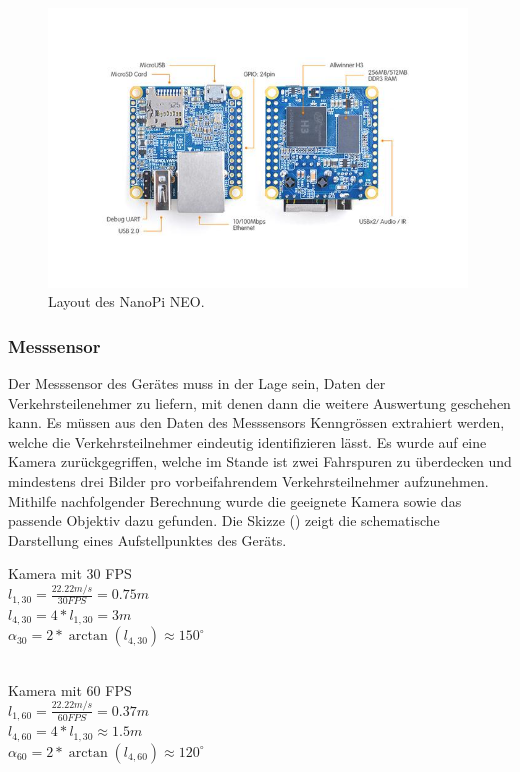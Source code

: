 \begin{figure}[H]
  \centering
  \includegraphics[width=0.99\textwidth]{Hardware/NanoPi_Neo.jpg} 
  \caption{Layout des NanoPi NEO. \cite{NanoPiNeo}}
  \label{bLayout}
\end{figure}

\subsubsection{Messsensor}
Der Messsensor des Gerätes muss in der Lage sein, Daten der Verkehrsteilenehmer zu liefern, mit denen dann die weitere Auswertung geschehen kann. Es müssen aus den Daten des Messsensors Kenngrössen extrahiert werden, welche die Verkehrsteilnehmer eindeutig identifizieren lässt. Es wurde auf eine Kamera zurückgegriffen, welche im Stande ist zwei Fahrspuren zu überdecken und mindestens drei Bilder pro vorbeifahrendem Verkehrsteilnehmer aufzunehmen. \\
Mithilfe nachfolgender Berechnung wurde die geeignete Kamera sowie das passende Objektiv dazu gefunden. Die Skizze () zeigt die schematische Darstellung eines Aufstellpunktes des Geräts.
\begin{citemize}

\item Kamera mit 30 FPS \\
$l_{ 1,30 } = \frac{ 22.22 m/s }{ 30 FPS} = 0.75 m$ \\ 
$l_{ 4,30 } = 4 * l_{1,30} = 3 m$\\
$\alpha_{30} = 2* \arctan(l_{4,30 }) \approx 150^\circ$ \\\\


\item Kamera mit 60 FPS \\
$l_{ 1,60 } = \frac{ 22.22 m/s }{ 60 FPS} = 0.37 m$ \\ 
$l_{ 4,60 } = 4 * l_{1,30} \approx 1.5 m$\\
$\alpha_{60} = 2* \arctan(l_{4,60 }) \approx 120^\circ$ \\\\
\end{citemize}

